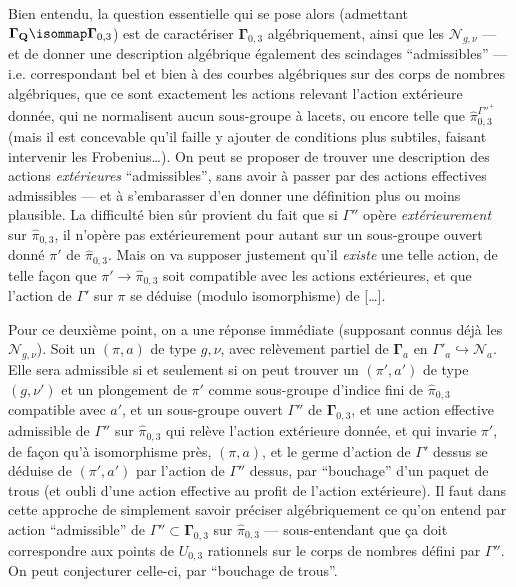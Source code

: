 Bien entendu, la question essentielle qui se pose alors (admettant $\boldsymbol{\Gamma}_\mathbf{Q} \isommap \boldsymbol{\Gamma}_{0,3}$) est de caractériser $\boldsymbol{\Gamma}_{0,3}$ algébriquement, ainsi que les $\mathcal{N}_{g,\nu}$ --- et de donner une description algébrique également des scindages ``admissibles'' --- i.e. correspondant bel et bien à des courbes algébriques sur des corps de nombres algébriques, que ce sont exactement les actions relevant l'action extérieure donnée, qui ne normalisent aucun sous-groupe à lacets, ou encore telle que $\hat{\pi}_{0,3}^{\Gamma''^+}$ (mais il est concevable qu'il faille y ajouter de conditions plus subtiles, faisant intervenir les Frobenius\dots). On peut se proposer de trouver une description des actions \emph{extérieures} ``admissibles'', sans avoir à passer par des actions effectives admissibles --- et à s'embarasser d'en donner une définition plus ou moins plausible. La difficulté bien sûr provient du fait que si $\Gamma''$ opère \emph{extérieurement} sur $\hat{\pi}_{0,3}$, il n'opère pas extérieurement pour autant sur un sous-groupe ouvert donné $\pi'$ de $\hat{\pi}_{0,3}$. 
Mais on va supposer justement qu'il \emph{existe} une telle action, de telle fa\c{c}on que $\pi' \to \hat{\pi}_{0,3}$ soit compatible avec les actions extérieures, et que l'action de $\Gamma'$ sur $\pi$ se déduise (modulo isomorphisme) de [\dots].

Pour ce deuxième point, on a une réponse immédiate (supposant connus déjà les $\mathcal{N}_{g,\nu}$). Soit un $(\pi, a)$ de type $g,\nu$, avec relèvement partiel de $\boldsymbol{\Gamma}_a$ en $\Gamma'_a \hookrightarrow \mathcal{N}_a$.  
Elle sera admissible si et seulement si on peut trouver un $(\pi', a')$ de type $(g, \nu')$ et un plongement de $\pi'$ comme sous-groupe d'indice fini de $\hat{\pi}_{0,3}$ compatible avec $a'$, et un sous-groupe ouvert $\Gamma''$ de $\boldsymbol{\Gamma}_{0,3}$, et une action effective admissible de $\Gamma''$ sur $\hat{\pi}_{0,3}$ qui relève l'action extérieure donnée, et qui invarie $\pi'$, de fa\c{c}on qu'à isomorphisme près, $(\pi, a)$, et le germe d'action de $\Gamma'$ dessus se déduise de $(\pi', a')$ par l'action de $\Gamma''$ dessus, par ``bouchage'' d'un paquet de trous (et oubli d'une action effective au profit de l'action extérieure). Il faut dans cette approche de simplement savoir préciser algébriquement ce qu'on entend par action ``admissible'' de $\Gamma''\subset \boldsymbol{\Gamma}_{0,3}$ sur $\hat{\pi}_{0,3}$ --- sous-entendant que \c{c}a doit correspondre aux points de $U_{0,3}$ rationnels sur le corps de nombres défini par $\Gamma''$. On peut conjecturer
celle-ci, par ``bouchage de trous''.

